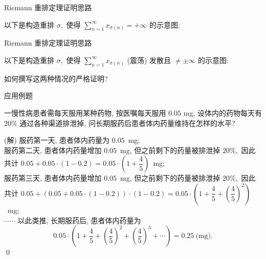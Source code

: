 
\begin{frame}{Riemann 重排定理证明思路}

以下是构造重排 $\sigma,$ 使得 $\sum\limits_{n=1}^{\infty} x_{\sigma(n)} = +\infty$ 的示意图:
\begin{center}

\end{center}

\end{frame}


\begin{frame}{Riemann 重排定理证明思路}

以下是构造重排 $\sigma,$ 使得 $\sum\limits_{n=1}^{\infty} x_{\sigma(n)}$ (震荡) 发散且 $\neq \pm\infty$ 的示意图:
\begin{center}

\end{center}

\pause

\begin{question}
如何撰写这两种情况的严格证明?
\end{question}

\end{frame}


\begin{frame}{应用例题}

\begin{eg}
一慢性病患者需每天服用某种药物, 按医嘱每天服用 $0.05$ mg, 设体内的药物每天有 $20\%$ 通过各种渠道排泄掉, 问长期服药后患者体内药量维持在怎样的水平?
\end{eg}

\pause

\startproof[bg=yellow, fg=red](解)
服药第一天, 患者体内药量为 $0.05$~mg; \\
\pause
服药第二天, 患者体内药量增加 $0.05$~mg, 但之前剩下的药量被排泄掉 $20\%,$ 因此共计 $0.05 + 0.05\cdot(1-0.2) = 0.05\cdot\left(1 + \dfrac{4}{5}\right)$~mg;\\
\pause
服药第三天, 患者体内药量增加 $0.05$~mg, 但之前剩下的药量被排泄掉 $20\%,$ 因此共计 $0.05 + (0.05 + 0.05\cdot(1-0.2))\cdot(1-0.2) = 0.05\cdot\left(1 + \dfrac{4}{5} + \left( \dfrac{4}{5} \right)^2\right)$~mg;\\
\pause
$\cdots\cdots$ 以此类推, 长期服药后, 患者体内药量为
\[0.05\cdot\left(1 + \dfrac{4}{5} + \left( \dfrac{4}{5} \right)^2 + \left( \dfrac{4}{5} \right)^3 + \cdots \right) = 0.25~\text{(mg)}.\]
\qed

\end{frame}

